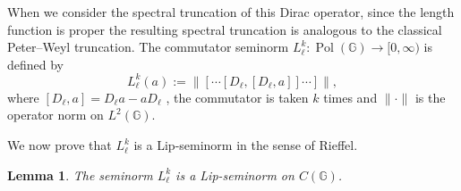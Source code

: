 \documentclass[12pt, reqno]{amsart}
\newtheorem{lemma}[theorem]{Lemma}
\theoremstyle{definition}
\theoremstyle{remark}
\numberwithin{equation}{section}
\begin{document}
When we consider the spectral truncation of this Dirac operator, since the 
length function is proper the resulting spectral truncation is analogous to 
the classical Peter--Weyl truncation.
The commutator seminorm 
$L_\ell^k: \operatorname{Pol}(\mathbb{G}) \to [0,\infty)$ is defined by
\[
L_\ell^k(a) := \|[\cdots[D_\ell,[D_\ell, a]]\cdots]\|,
\]
where $[D_\ell, a] = D_\ell a - a D_\ell$ , the commutator is taken $k$ times and $\|\cdot\|$ is the operator norm 
on $L^2(\mathbb{G})$.

We now prove that $L_\ell^k$ is a Lip-seminorm in the sense of Rieffel.


\begin{lemma}\label{lemma:lip-norm}
    The seminorm $L_\ell^k$ is a Lip-seminorm on $C(\mathbb{G})$.
\end{lemma}
\end{document}
